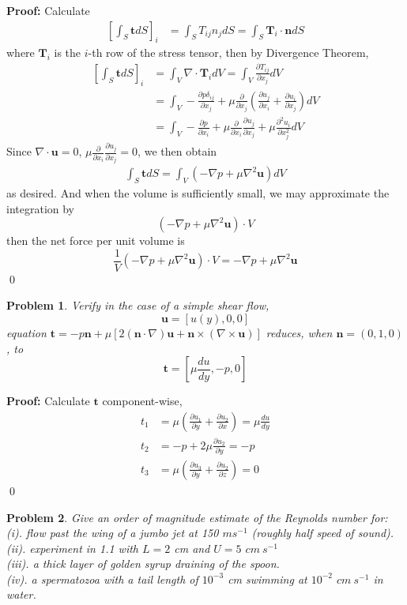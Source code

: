 \documentclass[12pt]{article}
\newtheorem{problem}{Problem}
\begin{document}
\textbf{Proof:} Calculate
\begin{align*}
    \left[\int_S\textbf{t}dS\right]_i&=\int_ST_{ij}n_jdS=\int_S\textbf{T}_i\cdot\textbf{n}dS
\end{align*}
where $\textbf{T}_i$ is the $i$-th row of the stress tensor, then by Divergence Theorem, 
\begin{align*}
    \left[\int_S\textbf{t}dS\right]_i&=\int_V\nabla\cdot\textbf{T}_idV=\int_V\frac{\partial T_{ij}}{\partial x_j}dV \\
    &=\int_V-\frac{\partial p\delta_{ij}}{\partial x_j}+\mu\frac{\partial}{\partial x_j}\left(\frac{\partial u_j}{\partial x_i}+\frac{\partial u_i}{\partial x_j}\right)dV \\
    &=\int_V-\frac{\partial p}{\partial x_i}+\mu\frac{\partial}{\partial x_i}\frac{\partial u_j}{\partial x_j}+\mu\frac{\partial^2 u_i}{\partial x_j^2}dV
\end{align*}
Since $\nabla\cdot \textbf{u}=0$, $\mu\frac{\partial}{\partial x_i}\frac{\partial u_j}{\partial x_j}=0$, we then obtain
\begin{align*}
    \int_S\textbf{t}dS=\int_V(-\nabla p+\mu\nabla^2\textbf{u})dV
\end{align*}
as desired. And when the volume is sufficiently small, we may approximate the integration by
$$
    (-\nabla p+\mu\nabla^2\textbf{u})\cdot V
$$
then the net force per unit volume is 
$$
    \frac{1}{V}(-\nabla p+\mu\nabla^2\textbf{u})\cdot V=-\nabla p+\mu\nabla^2\textbf{u}
$$
\qed 
\\
\begin{problem}
    Verify in the case of a simple shear flow, 
    $$
        \textbf{u}=[u(y), 0, 0]
    $$
    equation $\textbf{t}=-p\textbf{n}+\mu[2(\textbf{n}\cdot\nabla)\textbf{u}+\textbf{n}\times (\nabla\times \textbf{u})]$ reduces, when $\textbf{n}=(0, 1, 0)$, to 
    $$
        \textbf{t}=\left[\mu\frac{du}{dy}, -p, 0\right]
    $$
\end{problem}

\textbf{Proof:} Calculate $\textbf{t}$ component-wise,
\begin{align*}
   t_1&=\mu\left(\frac{\partial u_1}{\partial y}+\frac{\partial u_2}{\partial x}\right)=\mu\frac{du}{dy} \\
   t_2&=-p+2\mu\frac{\partial u_2}{\partial y}=-p \\
   t_3&=\mu\left(\frac{\partial u_3}{\partial y}+\frac{\partial u_2}{\partial z}\right)=0 
\end{align*}\qed
\\
\begin{problem}
    Give an order of magnitude estimate of the Reynolds number for: \\
    \indent (i). flow past the wing of a jumbo jet at 150 $ms^{-1}$ (roughly half speed of sound). \\
    \indent (ii). experiment in 1.1 with $L=2$ cm and $U=5$ $cm\ s^{-1}$ \\
    \indent (iii). a thick layer of golden syrup draining of the spoon. \\
    \indent (iv). a spermatozoa with a tail length of $10^{-3}$ cm swimming at $10^{-2}$ $cm\ s^{-1}$ in water.
\end{problem}
\end{document}
